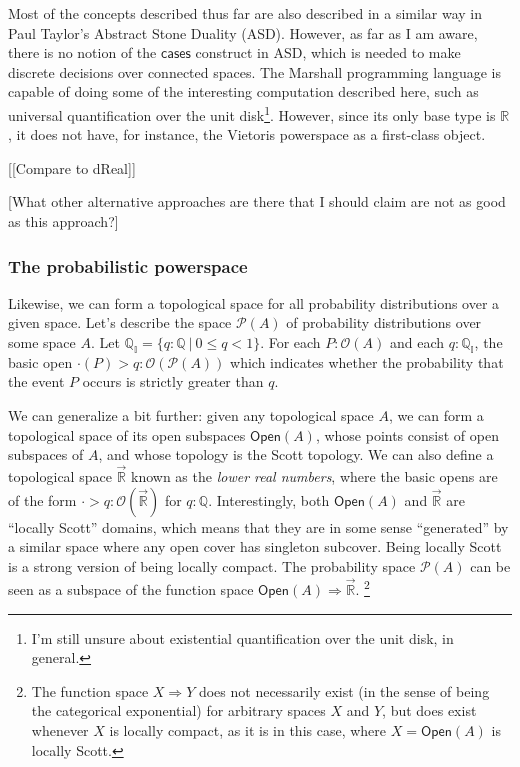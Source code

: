 \documentclass{article}           %
\newcommand{\R}{\mathbb{R}}
\newcommand{\rat}{\mathbb{Q}}
\newcommand{\suchthat}{\ |\ }
\newcommand{\Open}[1]{\mathcal{O}({#1})}
\newcommand{\Prob}{\mathcal{P}}
\newcommand{\ratint}{\rat_\mathbb{I}}
\newcommand{\lowerT}[1]{\overrightarrow{#1}}
\begin{document}
Most of the concepts described thus far are also described in a similar way in Paul Taylor's Abstract Stone Duality (ASD). However, as far as I am aware, there is no notion of the $\mathsf{cases}$ construct in ASD, which is needed to make discrete decisions over connected spaces. The Marshall programming language is capable of doing some of the interesting computation described here, such as universal quantification over the unit disk\footnote{I'm still unsure about existential quantification over the unit disk, in general.}. However, since its only base type is $\R$, it does not have, for instance, the Vietoris powerspace as a first-class object.

[[Compare to dReal]]

[What other alternative approaches are there that I should claim are not as good as this approach?]

\subsubsection{The probabilistic powerspace}

Likewise, we can form a topological space for all probability distributions over a given space. Let's describe the space $\Prob(A)$ of probability distributions over some space $A$. Let $\ratint = \{q : \rat \suchthat 0 \le q < 1 \}$. For each $P : \Open{A}$ and each $q : \ratint$, the basic open $\cdot(P) > q : \Open{\Prob(A)}$ which indicates whether the probability that the event $P$ occurs is strictly greater than $q$.

We can generalize a bit further: given any topological space $A$, we can form a topological space of its open subspaces $\mathsf{Open}(A)$, whose points consist of open subspaces of $A$, and whose topology is the Scott topology. We can also define a topological space $\lowerT{\R}$ known as the \emph{lower real numbers}, where the basic opens are of the form $\cdot > q : \Open{\lowerT{\R}}$ for $q : \rat$. Interestingly, both $\mathsf{Open}(A)$ and $\lowerT{\R}$ are ``locally Scott'' domains, which means that they are in some sense ``generated'' by a similar space where any open cover has singleton subcover. Being locally Scott is a strong version of being locally compact. The probability space $\Prob(A)$ can be seen as a subspace of the function space $\mathsf{Open}(A) \Rightarrow \lowerT{\R}$. \footnote{The function space $X \Rightarrow Y$ does not necessarily exist (in the sense of being the categorical exponential) for arbitrary spaces $X$ and $Y$, but does exist whenever $X$ is locally compact, as it is in this case, where $X = \mathsf{Open}(A)$ is locally Scott.}
\end{document}
